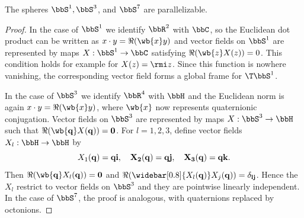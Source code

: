 \begin{prop}[{{\cite[Prop.~2.3.17]{RS1}}}]
    The spheres $\bbS^1,\bbS^3$, and $\bbS^7$ are parallelizable.
\end{prop}
\begin{proof}
    In the case of $\bbS^1$ we identify $\bbR^2$ with $\bbC$, so the Euclidean dot product can be written as $x\cdot y=\Re(\wb{x}y)$ and vector fields on $\bbS^1$ are represented by maps $X:\bbS^1\to \bbC$ satisfying $\Re(\wb{z}X(z))=0$. This condition holds for example for $X(z)=\rmi z$. Since this function is nowhere vanishing, the corresponding vector field forms a global frame for $\T\bbS^1$.

    In the case of $\bbS^3$ we identify $\bbR^4$ with $\bbH$ and the Euclidean norm is again $x\cdot y=\Re(\wb{x}y)$, where $\wb{x}$ now represents quaternionic conjugation. Vector fields on $\bbS^3$ are represented by maps $X:\bbS^3\to\bbH$ such that $\Re(\wb{\bf{q}}X(\bf{q}))=0$. For $l=1,2,3$, define vector fields $X_l:\bbH\to \bbH$ by
    \[X_1(\bf{q})=\bf{q}\bf{i},\quad X_2(\bf{q})=\bf{q}\bf{j},\quad X_3(\bf{q})=\bf{q}\bf{k}.\]
    Then $\Re(\wb{\bf{q}}X_l(\bf{q}))=0$ and $\Re(\widebar[0.8]{X_l(\bf{q})}X_j(\bf{q}))=\delta_{lj}$. Hence the $X_l$ restrict to vector fields on $\bbS^3$ and they are pointwise linearly independent. In the case of $\bbS^7$, the proof is analogous, with quaternions replaced by octonions.
\end{proof}

